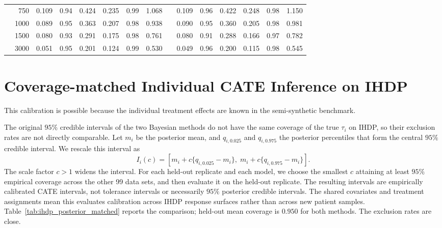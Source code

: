 \documentclass[12pt]{article}
\begin{document}
\begin{table}[htbp]
{\begin{tabular}{lr ccc ccc c ccc ccc}
& 750 & 0.109 & 0.94 & 0.424 & 0.235 & 0.99 & 1.068 &  & 0.109 & 0.96 & 0.422 & 0.248 & 0.98 & 1.150 \\
& 1000 & 0.089 & 0.95 & 0.363 & 0.207 & 0.98 & 0.938 &  & 0.090 & 0.95 & 0.360 & 0.205 & 0.98 & 0.981 \\
& 1500 & 0.080 & 0.93 & 0.291 & 0.175 & 0.98 & 0.761 &  & 0.080 & 0.91 & 0.288 & 0.166 & 0.97 & 0.782 \\
& 3000 & 0.051 & 0.95 & 0.201 & 0.124 & 0.99 & 0.530 &  & 0.049 & 0.96 & 0.200 & 0.115 & 0.98 & 0.545 \\
\bottomrule
\end{tabular}}
\end{table}

\section{Coverage-matched Individual CATE Inference on IHDP}
\label{subsec:ihdp_matched_supp}

This calibration is possible because the individual treatment effects are known in the semi-synthetic benchmark.

The original $95\%$ credible intervals of the two Bayesian methods do not have the same coverage of the true $\tau_i$ on IHDP, so their exclusion rates are not directly comparable. Let $m_i$ be the posterior mean, and $q_{i,0.025}$ and $q_{i,0.975}$ the posterior percentiles that form the central $95\%$ credible interval. We rescale this interval as
\[
 I_i(c)=\left[m_i+c\{q_{i,0.025}-m_i\},\;m_i+c\{q_{i,0.975}-m_i\}\right].
\]
The scale factor $c>1$ widens the interval. For each held-out replicate and each model, we choose the smallest $c$ attaining at least $95\%$ empirical coverage across the other 99 data sets, and then evaluate it on the held-out replicate. The resulting intervals are empirically calibrated CATE intervals, not tolerance intervals or necessarily $95\%$ posterior credible intervals. The shared covariates and treatment assignments mean this evaluates calibration across IHDP response surfaces rather than across new patient samples. Table~\ref{tab:ihdp_posterior_matched} reports the comparison; held-out mean coverage is $0.950$ for both methods. The exclusion rates are close.
\end{document}
